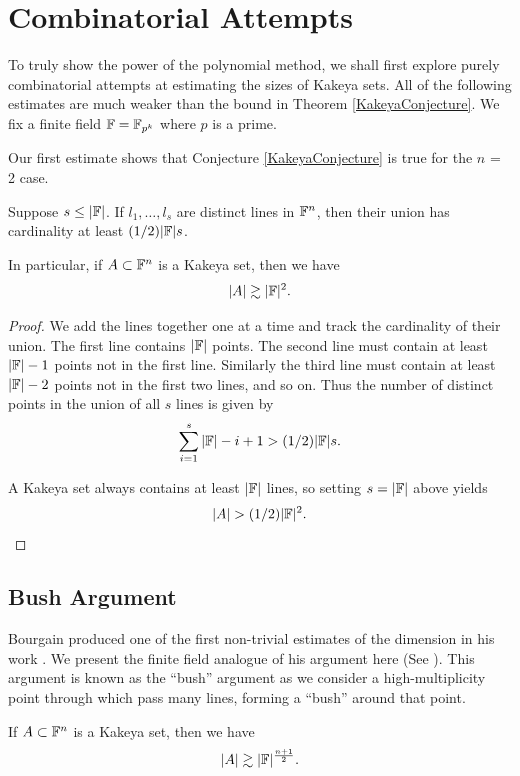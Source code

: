 \section{Combinatorial Attempts}
To truly show the power of the polynomial method, we shall first explore purely combinatorial attempts 
at estimating the sizes of Kakeya sets. All of the following estimates are much weaker than the bound in Theorem \ref{KakeyaConjecture}.
We fix a finite field $\mathbb F = \mathbb F_{p^k}$ where $p$ is a prime. 

Our first estimate shows that Conjecture \ref{KakeyaConjecture} is true for the $n$ = 2 case.

\begin{lemma}
    Suppose $s \leq |\mathbb F|$. If $l_1, \dots, l_s$ are distinct lines in $\mathbb F^n$, then their union has cardinality at least $(1/2)|\mathbb F|s$. \label{lem:kak-first-estimate}

    In particular, if $A \subset \mathbb F^n$ is a Kakeya set, then we have
    \[
      |A| \gtrsim |\mathbb F|^2.
    \] 
\end{lemma} 
\begin{proof}
    We add the lines together one at a time and track the cardinality of their union. The first line contains $|\mathbb F|$ points. The second line must contain at least $|\mathbb F| -1$ points not in the first line. Similarly the third line must contain at least $|\mathbb F| -2$ points not in the first two lines, and so on. Thus the number of distinct points in the union of all $s$ lines is given by
    \[
      \sum_{i=1}^{s} |\mathbb F| - i + 1  > (1/2) |\mathbb F| s.
    \]

    A Kakeya set always contains at least $|\mathbb F|$ lines, so setting $s=|\mathbb F|$ above yields
    \[
        |A| > (1/2) |\mathbb F|^2 .
    \]

\end{proof}

\subsection{Bush Argument} 
Bourgain produced one of the first non-trivial estimates of the dimension in his work \cite{BUSH1991}. We present the finite field analogue of his argument here (See \cite{GUTH2016}). This argument is known as the ``bush'' argument as we consider a high-multiplicity point through which pass many lines, forming a ``bush'' around that point. 


\begin{theorem}
If $A \subset \mathbb F^n$ is a Kakeya set, then we have
$$|A| \gtrsim |\mathbb F|^{\frac{n+1}{2}}.$$
\end{theorem}

